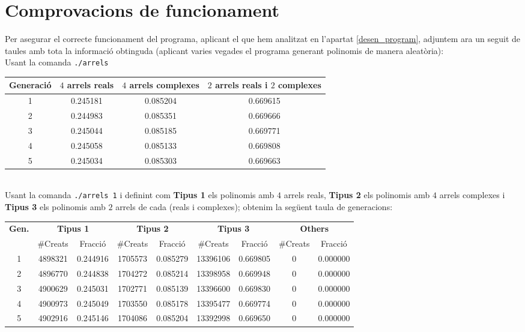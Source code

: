 \documentclass[a4paper, 11pt]{article}
\begin{document}
\section{Comprovacions de funcionament}\label{comprovacions}
Per asegurar el correcte funcionament del programa, aplicant el que hem analitzat en l'apartat \textcolor{blue}{\ref{desen_program}}, adjuntem ara un seguit de taules amb tota la informació obtinguda (aplicant varies vegades el programa generant polinomis de manera aleatòria):\\
Usant la comanda \texttt{./arrels}
\begin{table}[h]
    \centering
    \begin{tabular}{c||c|c|c}
        \textbf{Generació} & \textbf{$4$ arrels reals} & \textbf{$4$ arrels complexes} & \textbf{$2$ arrels reals i $2$ complexes} \\\hline\hline
        1 & 0.245181 & 0.085204 & 0.669615 \\\hline
        2 & 0.244983 & 0.085351 & 0.669666  \\\hline
        3 & 0.245044 & 0.085185 & 0.669771 \\\hline
        4 & 0.245058 & 0.085133 & 0.669808  \\\hline
        5 & 0.245034 & 0.085303 & 0.669663\\
        
    \end{tabular}
    \label{tab:my_label}
\end{table}\\
Usant la comanda \texttt{./arrels 1} i definint com \textbf{Tipus 1} els polinomis amb $4$ arrels reals, \textbf{Tipus 2} els polinomis amb $4$ arrels complexes i \textbf{Tipus 3} els polinomis amb $2$ arrels de cada (reals i complexes); obtenim la següent taula de generacions:
\begin{table}[h]
    \centering
    \begin{tabular}{c||c|c|c|c|c|c|c|c}
        \multirow{2}{*}{\textbf{Gen.}} & \multicolumn{2}{c|}{\textbf{Tipus 1}}  & \multicolumn{2}{c|}{\textbf{Tipus 2}} &  \multicolumn{2}{c|}{\textbf{Tipus 3}} & \multicolumn{2}{c}{\textbf{Others}} \\
        & \#Creats & Fracció & \#Creats & Fracció  & \#Creats & Fracció  & \#Creats & Fracció \\ \hline \hline
        1 & 4898321 & 0.244916 & 1705573 & 0.085279 & 13396106 & 0.669805 & 0 & 0.000000 \\\hline
        2 & 4896770 & 0.244838 & 1704272 & 0.085214 & 13398958 & 0.669948 & 0 & 0.000000 \\\hline
        3 & 4900629 & 0.245031 & 1702771 & 0.085139 & 13396600 & 0.669830 & 0 & 0.000000 \\\hline
        4 & 4900973 & 0.245049 & 1703550 & 0.085178 & 13395477 & 0.669774 & 0 & 0.000000 \\\hline
        5 & 4902916 & 0.245146 & 1704086 & 0.085204 & 13392998 & 0.669650 & 0 & 0.000000 \\
    \end{tabular}
    \label{tab:my_label}
\end{table}
\end{document}
